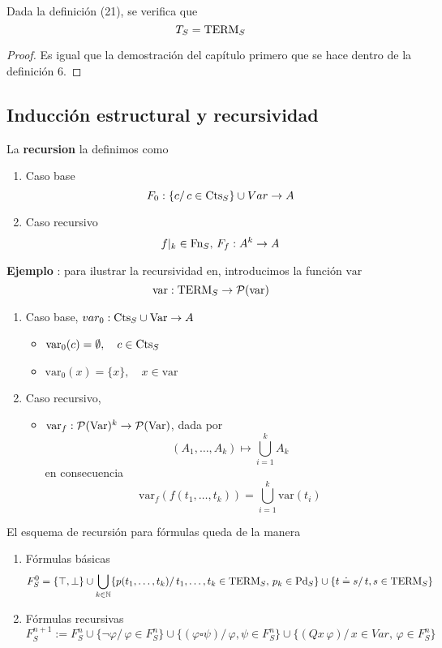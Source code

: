 \paragraph{}
\begin{prop}
Dada la definición (21), se verifica que 
\[ T_S = \mbox{TERM}_{S} \]
\end{prop}
\begin{proof}
Es igual que la demostración del capítulo primero que se hace dentro de la definición 6.
\end{proof}
\subsection{Inducción estructural y recursividad}
La \textbf{recursion} la definimos como 
\begin{enumerate}
    \item Caso base
    \[ F_0: \{c /\,  c \in \mbox{Cts}_{S} \} \cup Var \rightarrow A \]
    \item Caso recursivo 
    \[ f\vert_{k} \in \mbox{Fn}_{S}, \, F_f: A^{k} \rightarrow A  \]
\end{enumerate}
\addtocounter{ej}{1} %
\textbf{Ejemplo }: para ilustrar la recursividad en, introducimos la función $\mbox{var}$
\[ \mbox{var}: \mbox{TERM}_{S} \rightarrow \mathcal{P}(\mbox{var}) \]
\begin{enumerate}
	\item Caso base, $var_{0}: \mbox{Cts}_{S} \cup \mbox{Var} \rightarrow A$
	\begin{itemize}
		\item $\mbox{var}_{0}(c) = \emptyset, \quad c \in \mbox{Cts}_{S}$
		\item $\mbox{var}_{0}(x) = \{x\}, \quad x \in \mbox{var}$	
	\end{itemize} 
    \item Caso recursivo, 
    \begin{itemize}
    \item $\mbox{var}_{f}: \mathcal{P} (\mbox{Var})^{k} \rightarrow \mathcal{P} (\mbox{Var})$, dada por
    \[ (A_1, \dots, A_k) \mapsto \bigcup_{i = 1}^{k} A_k \]
    en consecuencia
    \[ \mbox{var}_{f}(f(t_1, \dots, t_k)) = \bigcup_{i = 1}^{k} \mbox{var}(t_i) \]
    \end{itemize} 
\end{enumerate}
El esquema de recursión para fórmulas queda de la manera 
\begin{enumerate}
	\item Fórmulas básicas 
\[ F_{S}^{0}=  \{ \top, \bot \} \cup  \bigcup_{k \in \mathbb{N}}\{ p(t_1, \ldots, t_k) / \, t_1, \ldots, t_k \in \mbox{TERM}_{S}, \, p_k \in \mbox{Pd}_{S}  \} \cup  \{ t \doteq s / \, t,s \in \mbox{TERM}_{S}\}  \]	
\item Fórmulas recursivas 
\[ F_{S}^{n+1} := F_{S}^{n} \cup \{ \neg \varphi /  \, \varphi \in F_{S}^{n}\} \cup \{ (\varphi \square \psi) / \, \varphi, \psi \in F_{S}^{n}\} \cup \{(Qx \, \varphi) / \, x \in Var, \, \varphi \in F_{S}^{n}\} \]
\end{enumerate}
